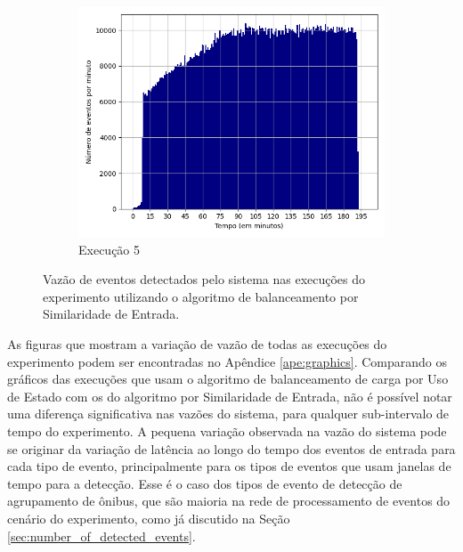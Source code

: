 \begin{figure}[h!]
\begin{subfigure}{.5\textwidth}
  \includegraphics[width=\linewidth]{figuras/graphics/histogram_vazao_10-dez-is.png}  
  \caption{Execução 5}
  \label{fig:histv-10-dez-is}
\end{subfigure}
\caption{Vazão de eventos detectados pelo sistema nas execuções do experimento utilizando o algoritmo de balanceamento por Similaridade de Entrada.}
\label{fig:histogram_full_IS}
\end{figure}


As figuras que mostram a variação de vazão de todas as execuções do experimento podem ser encontradas no Apêndice \ref{ape:graphics}. Comparando os gráficos das execuções que usam o algoritmo de balanceamento de carga por Uso de Estado com os do algoritmo por Similaridade de Entrada, não é possível notar uma diferença significativa nas vazões do sistema, para qualquer sub-intervalo de tempo do experimento. A pequena variação observada na vazão do sistema pode se originar da variação de latência ao longo do tempo dos eventos de entrada para cada tipo de evento, principalmente para os tipos de eventos que usam janelas de tempo para a detecção. Esse é o caso dos tipos de evento de detecção de agrupamento de ônibus, que são maioria na rede de processamento de eventos do cenário do experimento, como já discutido na Seção \ref{sec:number_of_detected_events}.



